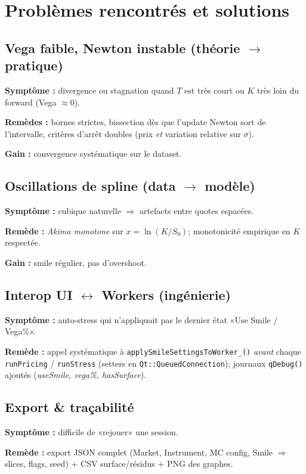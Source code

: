 \documentclass[11pt,a4paper]{article}
\begin{document}
\clearpage
\section{Problèmes rencontrés et solutions}

\subsection{Vega faible, Newton instable (théorie $\to$ pratique)}
\textbf{Symptôme :} divergence ou stagnation quand $T$ est très court ou $K$ très loin du forward (Vega $\approx 0$).

\textbf{Remèdes :} bornes strictes, bissection dès que l'update Newton sort de l'intervalle,
critères d'arrêt doubles (prix \emph{et} variation relative sur $\sigma$). 

\textbf{Gain :} convergence systématique sur le dataset.

\subsection{Oscillations de spline (data $\to$ modèle)}
\textbf{Symptôme :} cubique naturelle $\Rightarrow$ artefacts entre quotes espacées.

\textbf{Remède :} \emph{Akima monotone} sur $x=\ln(K/S_0)$; monotonicité empirique en $K$ respectée.

\textbf{Gain :} smile régulier, pas d'overshoot.

\subsection{Interop UI \texorpdfstring{$\leftrightarrow$}{↔} Workers (ingénierie)}
\textbf{Symptôme :} auto-stress qui n'appliquait pas le dernier état «Use Smile / Vega\%».

\textbf{Remède :} appel systématique à \texttt{applySmileSettingsToWorker\_()} \emph{avant} chaque
\texttt{runPricing} / \texttt{runStress} (setters en \texttt{Qt::QueuedConnection}); 
journaux \texttt{qDebug()} ajoutés (\emph{useSmile, vega\%, hasSurface}).

\subsection{Export \& traçabilité}
\textbf{Symptôme :} difficile de «rejouer» une session.

\textbf{Remède :} export JSON complet (Market, Instrument, MC config, Smile $\Rightarrow$ slices,
flags, seed) + CSV surface/résidus + PNG des graphes. 
\end{document}
